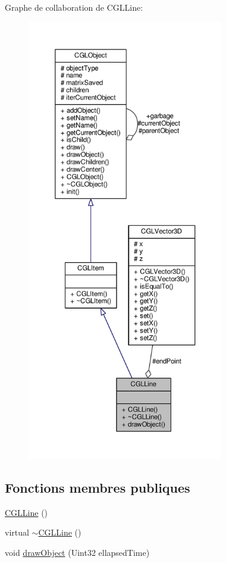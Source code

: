 Graphe de collaboration de C\-G\-L\-Line\-:\nopagebreak
\begin{figure}[H]
\begin{center}
\leavevmode
\includegraphics[height=550pt]{db/d95/class_c_g_l_line__coll__graph}
\end{center}
\end{figure}
\subsection*{Fonctions membres publiques}
\begin{DoxyCompactItemize}
\item 
\hyperlink{class_c_g_l_line_ab220112ce9d381cc057e6cff09fd95a7}{C\-G\-L\-Line} ()
\item 
virtual \hyperlink{class_c_g_l_line_ae00c52a8b8890cbe7657862aad150022}{$\sim$\-C\-G\-L\-Line} ()
\item 
void \hyperlink{class_c_g_l_line_a9621fa37a8b87f06e2a67aa8bf17d957}{draw\-Object} (Uint32 ellapsed\-Time)
\end{DoxyCompactItemize}
